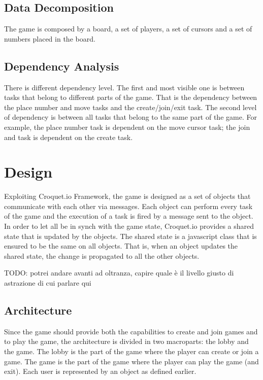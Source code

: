 \documentclass[12pt, a4paper]{report}
\begin{document}
\section{Data Decomposition}
The game is composed by a board, a set of players, a set of cursors and a set of numbers placed in the board.

\section{Dependency Analysis}
There is different dependency level. The first and most visible one is between tasks that belong to different parts of the game. That is the dependency between the place number and move tasks and the create/join/exit task. The second level of dependency is between all tasks that belong to the same part of the game. For example, the place number task is dependent on the move cursor task; the join and task is dependent on the create task.\\

\chapter{Design}
Exploiting Croquet.io Framework, the game is designed as a set of objects that communicate with each other via messages. Each object can perform every task of the game and the execution of a task is fired by a message sent to the object. In order to let all be in synch with the game state, Croquet.io provides a shared state that is updated by the objects. The shared state is a javascript class that is ensured to be the same on all objects. That is, when an object updates the shared state, the change is propagated to all the other objects.

TODO: potrei andare avanti ad oltranza, capire quale è il livello giusto di astrazione di cui parlare qui

\section{Architecture}
Since the game should provide both the capabilities to create and join games and to play the game, the architecture is divided in two macroparts: the lobby and the game. The lobby is the part of the game where the player can create or join a game. The game is the part of the game where the player can play the game (and exit). Each user is represented by an object as defined earlier.
\end{document}
